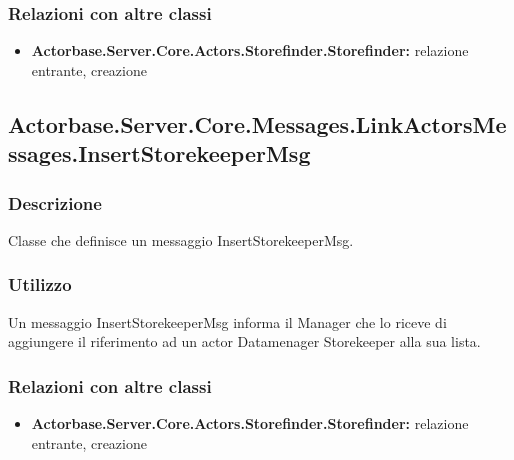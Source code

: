 \documentclass[a4paper]{article}
\begin{document}
			\subsubsection{Relazioni con altre classi}
			\begin{itemize}
				\item \textbf{Actorbase.Server.Core.Actors.Storefinder.Storefinder:} relazione entrante, creazione
			\end{itemize}

			\subsection{Actorbase.Server.Core.Messages.LinkActorsMessages.InsertStorekeeperMsg}
			\subsubsection{Descrizione}
				Classe che definisce un messaggio InsertStorekeeperMsg.
			\subsubsection{Utilizzo}
				Un messaggio InsertStorekeeperMsg informa il Manager che lo riceve di aggiungere il riferimento ad un actor Datamenager Storekeeper alla sua lista.
			\subsubsection{Relazioni con altre classi}
			\begin{itemize}
				\item \textbf{Actorbase.Server.Core.Actors.Storefinder.Storefinder:} relazione entrante, creazione
			\end{itemize}
			
\end{document}
